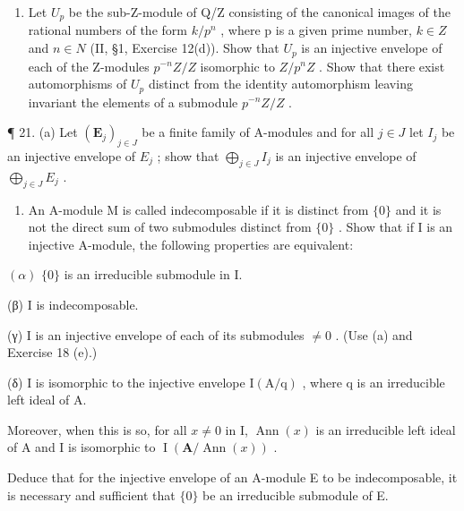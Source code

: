 \begin{enumerate}
\def\labelenumi{(\alph{enumi})}
\setcounter{enumi}{1}
\tightlist
\item
  Let \(U_{p}\) be the sub-Z-module of Q/Z consisting of the canonical images of the rational numbers of the form \(k/p^{n}\) , where p is a given prime number, \(k \in Z\) and \(n \in N\) (II, §1, Exercise 12(d)). Show that \(U_{p}\) is an injective envelope of each of the Z-modules \(p^{-n}Z/Z\) isomorphic to \(Z/p^{n}Z\) . Show that there exist automorphisms of \(U_{p}\) distinct from the identity automorphism leaving invariant the elements of a submodule \(p^{-n}Z/Z\) .
\end{enumerate}

¶ 21. (a) Let \((\mathbf{E}_j)_{j \in J}\) be a finite family of A-modules and for all \(j \in J\) let \(I_j\) be an injective envelope of \(E_j\) ; show that \(\bigoplus_{j \in J} I_j\) is an injective envelope of \(\bigoplus_{j \in J} E_j\) .

\begin{enumerate}
\def\labelenumi{(\alph{enumi})}
\setcounter{enumi}{1}
\tightlist
\item
  An A-module M is called indecomposable if it is distinct from \(\{0\}\) and it is not the direct sum of two submodules distinct from \(\{0\}\) . Show that if I is an injective A-module, the following properties are equivalent:
\end{enumerate}

\((\alpha)\) \(\{0\}\) is an irreducible submodule in I.

(β) I is indecomposable.

(γ) I is an injective envelope of each of its submodules \(\neq0\) . (Use (a) and Exercise 18 (e).)

(δ) I is isomorphic to the injective envelope \(\mathrm{I}(\mathrm{A}/\mathrm{q})\) , where q is an irreducible left ideal of A.

Moreover, when this is so, for all \(x \neq 0\) in I, \(\operatorname{Ann}(x)\) is an irreducible left ideal of A and I is isomorphic to \(\operatorname{I}(\mathbf{A} / \operatorname{Ann}(x))\) .

Deduce that for the injective envelope of an A-module E to be indecomposable, it is necessary and sufficient that \(\{0\}\) be an irreducible submodule of E.

